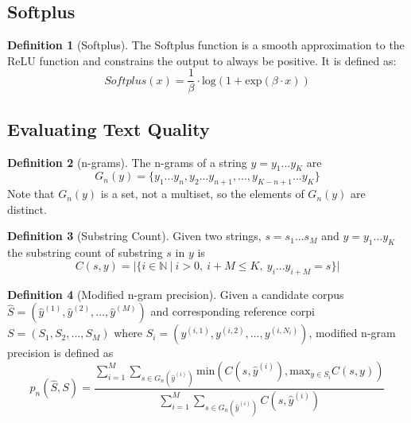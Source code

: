 \documentclass[11pt]{article}
\theoremstyle{definition}
\newtheorem{definition}{Definition}[section]
\begin{document}
\subsection{Softplus}

\begin{definition}[Softplus] The $\mathrm{Softplus}$ function is a smooth approximation to the ReLU function and constrains the output to always be positive. It is defined as:
\begin{equation}
Softplus(x) = \frac{1}{\beta} \cdot \mathrm{log} \left( 1 + \mathrm{exp} \left( \beta \cdot x \right) \right)
\end{equation}
\end{definition}

\subsection{Evaluating Text Quality}

\begin{definition}[n-grams] The n-grams of a string $y = y_1...y_K$ are
\begin{equation}
G_n(y) = \{ y_1...y_n, y_2...y_{n+1}, ... , y_{K-n+1}...y_K \}
\end{equation}
Note that $G_n(y)$ is a set, not a multiset, so the elements of $G_n(y)$ are distinct.
\end{definition}

\begin{definition}[Substring Count] Given two strings, $s = s_1...s_M$ and $y = y_1...y_K$ the substring count of substring $s$ in $y$ is
\begin{equation}
C(s,y) = | \{i \in \mathbb{N} \ | \ i > 0, \ i+M \leq K, \ y_i...y_{i+M} = s \} |
\end{equation}  
\end{definition}

\begin{definition}[Modified n-gram precision] Given a candidate corpus $\hat{S} = (\hat{y}^{(1)}, \hat{y}^{(2)}, ..., \hat{y}^{(M)})$ and corresponding reference corpi $S = (S_1, S_2, ..., S_M)$ where $S_i = (y^{(i,1)}, y^{(i,2)}, ..., y^{(i,N_i)})$, modified n-gram precision is defined as
\begin{equation}
p_n(\hat{S} , S) = \frac{\sum_{i=1}^M \sum_{s \in G_n(\hat{y}^{(i)})} \mathrm{min} (C(s, \hat{y}^{(i)}), \mathrm{max}_{y \in S_i} C(s,y))}{\sum_{i=1}^M \sum_{s \in G_n(\hat{y}^{(i)})} C(s, \hat{y}^{(i)})}
\end{equation}
\end{definition}
\end{document}
